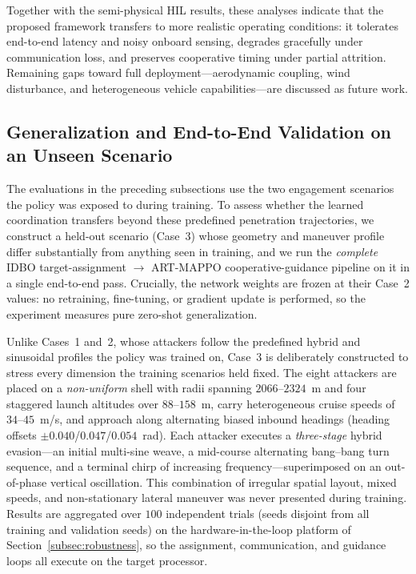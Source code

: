 \documentclass[lettersize,journal]{IEEEtran}
\newcommand{\hladd}[1]{{\color{blue}#1}}
\begin{document}
\hladd{Together with the semi-physical HIL results, these analyses indicate that the proposed
framework transfers to more realistic operating conditions: it tolerates end-to-end latency and
noisy onboard sensing, degrades gracefully under communication loss, and preserves cooperative
timing under partial attrition. Remaining gaps toward full deployment---aerodynamic coupling,
wind disturbance, and heterogeneous vehicle capabilities---are discussed as future work.}



\subsection{\hladd{Generalization and End-to-End Validation on an Unseen Scenario}}
\label{subsec:generalization}

\hladd{The evaluations in the preceding subsections use the two engagement scenarios the policy was
exposed to during training. To assess whether the learned coordination transfers beyond these
predefined penetration trajectories, we construct a held-out scenario (Case~3) whose geometry and
maneuver profile differ substantially from anything seen in training, and we run the \emph{complete}
IDBO target-assignment $\rightarrow$ ART-MAPPO cooperative-guidance pipeline on it in a single
end-to-end pass. Crucially, the network weights are frozen at their Case~2 values: no retraining,
fine-tuning, or gradient update is performed, so the experiment measures pure zero-shot
generalization.}

\hladd{Unlike Cases~1 and~2, whose attackers follow the predefined hybrid and sinusoidal profiles the
policy was trained on, Case~3 is deliberately constructed to stress every dimension the training
scenarios held fixed. The eight attackers are placed on a \emph{non-uniform} shell with radii spanning
$2066$--$2324$~m and four staggered launch altitudes over $88$--$158$~m, carry heterogeneous cruise
speeds of $34$--$45$~m/s, and approach along alternating biased inbound headings (heading offsets
$\pm0.040$/$0.047$/$0.054$~rad). Each attacker executes a \emph{three-stage} hybrid evasion---an
initial multi-sine weave, a mid-course alternating bang--bang turn sequence, and a terminal chirp of
increasing frequency---superimposed on an out-of-phase vertical oscillation. This combination of
irregular spatial layout, mixed speeds, and non-stationary lateral maneuver was never presented during
training. Results are aggregated over $100$ independent trials (seeds disjoint from all training and
validation seeds) on the hardware-in-the-loop platform of Section~\ref{subsec:robustness}, so the
assignment, communication, and guidance loops all execute on the target processor.}
\end{document}
